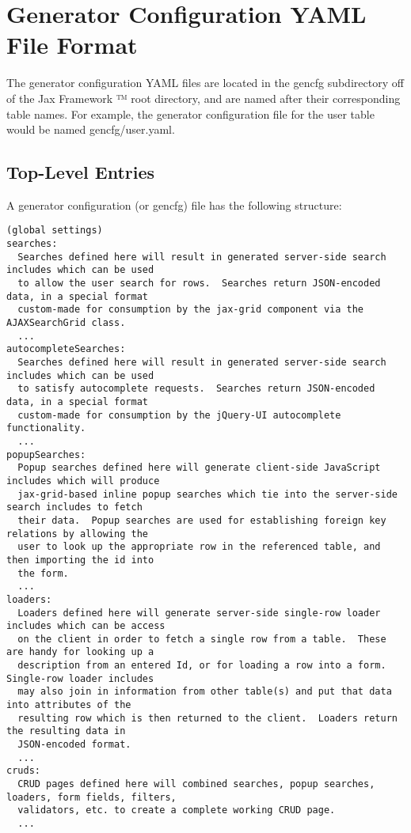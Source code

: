 \documentclass[letterpaper,10pt,english]{sphinxmanual}
\begin{document}
\section{Generator Configuration YAML File Format}
\label{jaxFrameworkGuide:generator-configuration-yaml-file-format}
The generator configuration YAML files are located in the gencfg subdirectory off of the Jax
Framework ™ root directory, and are named after their corresponding table names.  For example,
the generator configuration file for the user table would be named gencfg/user.yaml.


\subsection{Top-Level Entries}
\label{jaxFrameworkGuide:top-level-entries}
A generator configuration (or gencfg) file has the following structure:

\begin{Verbatim}[commandchars=\\\{\}]
(global settings)
searches:
  Searches defined here will result in generated server-side search includes which can be used
  to allow the user search for rows.  Searches return JSON-encoded data, in a special format
  custom-made for consumption by the jax-grid component via the AJAXSearchGrid class.
  ...
autocompleteSearches:
  Searches defined here will result in generated server-side search includes which can be used
  to satisfy autocomplete requests.  Searches return JSON-encoded data, in a special format
  custom-made for consumption by the jQuery-UI autocomplete functionality.
  ...
popupSearches:
  Popup searches defined here will generate client-side JavaScript includes which will produce
  jax-grid-based inline popup searches which tie into the server-side search includes to fetch
  their data.  Popup searches are used for establishing foreign key relations by allowing the
  user to look up the appropriate row in the referenced table, and then importing the id into
  the form.
  ...
loaders:
  Loaders defined here will generate server-side single-row loader includes which can be access
  on the client in order to fetch a single row from a table.  These are handy for looking up a
  description from an entered Id, or for loading a row into a form.  Single-row loader includes
  may also join in information from other table(s) and put that data into attributes of the
  resulting row which is then returned to the client.  Loaders return the resulting data in
  JSON-encoded format.
  ...
cruds:
  CRUD pages defined here will combined searches, popup searches, loaders, form fields, filters,
  validators, etc. to create a complete working CRUD page.
  ...
\end{Verbatim}
\end{document}
